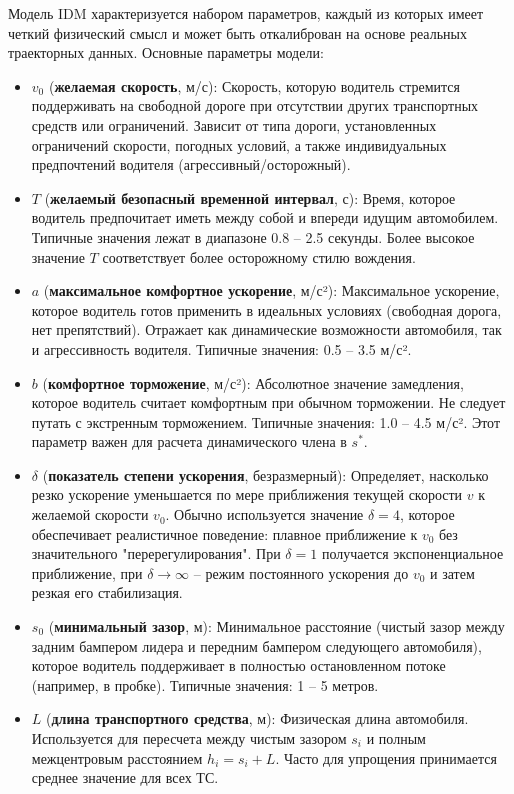 \documentclass[12pt, a4paper]{article}
\begin{document}
Модель IDM характеризуется набором параметров, каждый из которых имеет четкий физический смысл и может быть откалиброван на основе реальных траекторных данных. Основные параметры модели:
\begin{itemize}
    \item $v_0$ (\textbf{желаемая скорость}, м/с): Скорость, которую водитель стремится поддерживать на свободной дороге при отсутствии других транспортных средств или ограничений. Зависит от типа дороги, установленных ограничений скорости, погодных условий, а также индивидуальных предпочтений водителя (агрессивный/осторожный).
    \item $T$ (\textbf{желаемый безопасный временной интервал}, с): Время, которое водитель предпочитает иметь между собой и впереди идущим автомобилем. Типичные значения лежат в диапазоне 0.8 – 2.5 секунды. Более высокое значение $T$ соответствует более осторожному стилю вождения.
    \item $a$ (\textbf{максимальное комфортное ускорение}, м/с²): Максимальное ускорение, которое водитель готов применить в идеальных условиях (свободная дорога, нет препятствий). Отражает как динамические возможности автомобиля, так и агрессивность водителя. Типичные значения: 0.5 – 3.5 м/с².
    \item $b$ (\textbf{комфортное торможение}, м/с²): Абсолютное значение замедления, которое водитель считает комфортным при обычном торможении. Не следует путать с экстренным торможением. Типичные значения: 1.0 – 4.5 м/с². Этот параметр важен для расчета динамического члена в $s^*$.
    \item $\delta$ (\textbf{показатель степени ускорения}, безразмерный): Определяет, насколько резко ускорение уменьшается по мере приближения текущей скорости $v$ к желаемой скорости $v_0$. Обычно используется значение $\delta = 4$, которое обеспечивает реалистичное поведение: плавное приближение к $v_0$ без значительного "перерегулирования". При $\delta=1$ получается экспоненциальное приближение, при $\delta \to \infty$ – режим постоянного ускорения до $v_0$ и затем резкая его стабилизация.
    \item $s_0$ (\textbf{минимальный зазор}, м): Минимальное расстояние (чистый зазор между задним бампером лидера и передним бампером следующего автомобиля), которое водитель поддерживает в полностью остановленном потоке (например, в пробке). Типичные значения: 1 – 5 метров.
    \item $L$ (\textbf{длина транспортного средства}, м): Физическая длина автомобиля. Используется для пересчета между чистым зазором $s_i$ и полным межцентровым расстоянием $h_i = s_i + L$. Часто для упрощения принимается среднее значение для всех ТС.
\end{itemize}
\end{document}
